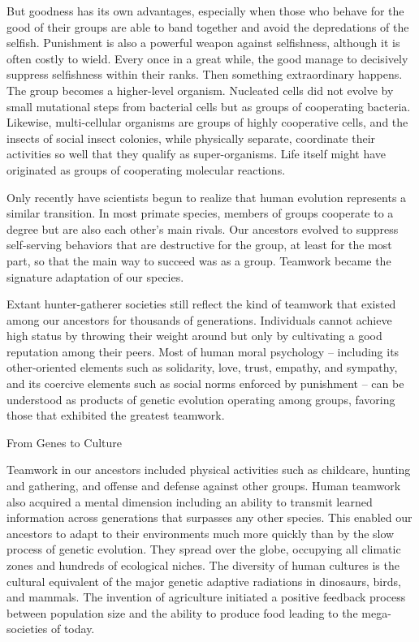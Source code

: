 \documentclass[
]{book}
\begin{document}
But goodness has its own advantages, especially when those who behave for the good of their groups are able to band together and avoid the depredations of the selfish. Punishment is also a powerful weapon against selfishness, although it is often costly to wield. Every once in a great while, the good manage to decisively suppress selfishness within their ranks. Then something extraordinary happens. The group becomes a higher-level organism. Nucleated cells did not evolve by small mutational steps from bacterial cells but as groups of cooperating bacteria. Likewise, multi-cellular organisms are groups of highly cooperative cells, and the insects of social insect colonies, while physically separate, coordinate their activities so well that they qualify as super-organisms. Life itself might have originated as groups of cooperating molecular reactions.

Only recently have scientists begun to realize that human evolution represents a similar transition. In most primate species, members of groups cooperate to a degree but are also each other's main rivals. Our ancestors evolved to suppress self-serving behaviors that are destructive for the group, at least for the most part, so that the main way to succeed was as a group. Teamwork became the signature adaptation of our species.

Extant hunter-gatherer societies still reflect the kind of teamwork that existed among our ancestors for thousands of generations. Individuals cannot achieve high status by throwing their weight around but only by cultivating a good reputation among their peers. Most of human moral psychology -- including its other-oriented elements such as solidarity, love, trust, empathy, and sympathy, and its coercive elements such as social norms enforced by punishment -- can be understood as products of genetic evolution operating among groups, favoring those that exhibited the greatest teamwork.

From Genes to Culture

Teamwork in our ancestors included physical activities such as childcare, hunting and gathering, and offense and defense against other groups. Human teamwork also acquired a mental dimension including an ability to transmit learned information across generations that surpasses any other species. This enabled our ancestors to adapt to their environments much more quickly than by the slow process of genetic evolution. They spread over the globe, occupying all climatic zones and hundreds of ecological niches. The diversity of human cultures is the cultural equivalent of the major genetic adaptive radiations in dinosaurs, birds, and mammals. The invention of agriculture initiated a positive feedback process between population size and the ability to produce food leading to the mega-societies of today.
\end{document}
